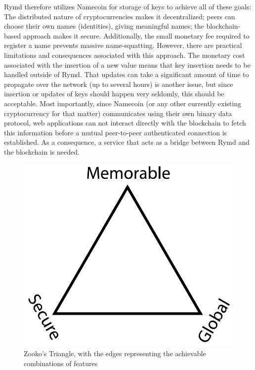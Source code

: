 Rymd therefore utilizes Namecoin for storage of keys to achieve all of these goals: The distributed nature of cryptocurrencies makes it decentralized; peers can choose their own names (identities), giving meaningful names; the blockchain-based approach makes it secure. Additionally, the small monetary fee required to register a name prevents massive name-squatting. However, there are practical limitations and consequences associated with this approach. The monetary cost associated with the insertion of a new value means that key insertion needs to be handled outside of Rymd. That updates can take a significant amount of time to propagate over the network (up to several hours) is another issue, but since insertion or updates of keys should happen very seldomly, this should be acceptable. Most importantly, since Namecoin (or any other currently existing cryptocurrency for that matter) communicates using their own binary data protocol\cite{BitcoinSource:2014:Online}, web applications can not interact directly with the blockchain to fetch this information before a mutual peer-to-peer authenticated connection is established. As a consequence, a service that acts as a bridge between Rymd and the blockchain is needed.

\begin{figure}[h]
\centering
\includegraphics[width=\textwidth,height=0.2\paperheight,keepaspectratio
]{figures/Zooko_s_Triangle}
\caption{Zooko's Triangle, with the edges representing the achievable combinations of features \cite{Zooko:2001:Online}}
\label{fig:zooko}
\end{figure}

